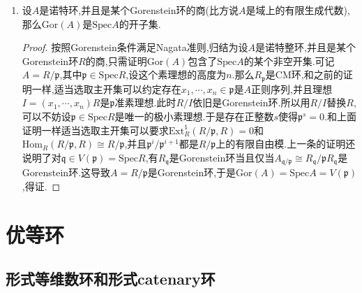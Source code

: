 \begin{enumerate}
\begin{proof}
    	于是$A_{\mathfrak{q}}$是Gorenstein环当且仅当$A_{\mathfrak{q}}/\mathfrak{p}A_{\mathfrak{q}}$是Gorenstein环,换句话讲$\mathrm{Gor}(A/\mathfrak{p})=\mathrm{Gor}(A)\cap V(\mathfrak{p})$.最后Nagata准则告诉我们$\mathrm{Gor}(A/\mathfrak{p})$包含了$V(\mathfrak{p})$的非空开子集,这验证了拓扑Nagata准则的第二个条件.
    \end{proof}
    \item 设$A$是诺特环,并且是某个Gorenstein环的商(比方说$A$是域上的有限生成代数),那么$\mathrm{Gor}(A)$是$\mathrm{Spec}A$的开子集.
    \begin{proof}
    	
    	按照Gorenstein条件满足Nagata准则,归结为设$A$是诺特整环,并且是某个Gorenstein环$R$的商,只需证明$\mathrm{Gor}(A)$包含了$\mathrm{Spec}A$的某个非空开集.可记$A=R/\mathfrak{p}$,其中$\mathfrak{p}\in\mathrm{Spec}R$,设这个素理想的高度为$n$.那么$R_{\mathfrak{p}}$是CM环,和之前的证明一样,适当选取主开集可以约定存在$x_1,\cdots,x_n\in\mathfrak{p}$是$A$正则序列,并且理想$I=(x_1,\cdots,x_n)R$是$\mathfrak{p}$准素理想.此时$R/I$依旧是Gorenstein环.所以用$R/I$替换$R$,可以不妨设$\mathfrak{p}\in\mathrm{Spec}R$是唯一的极小素理想.于是存在正整数$s$使得$\mathfrak{p}^s=0$.和上面证明一样适当选取主开集可以要求$\mathrm{Ext}_R^1(R/\mathfrak{p},R)=0$和$\mathrm{Hom}_R(R/\mathfrak{p},R)\cong R/\mathfrak{p}$,并且$\mathfrak{p}^i/\mathfrak{p}^{i+1}$都是$R/\mathfrak{p}$上的有限自由模.上一条的证明还说明了对$\mathfrak{q}\in V(\mathfrak{p})=\mathrm{Spec}R$,有$R_{\mathfrak{q}}$是Gorenstein环当且仅当$A_{\mathfrak{q}/\mathfrak{p}}\cong R_{\mathfrak{q}}/\mathfrak{p}R_{\mathfrak{q}}$是Gorenstein环.这导致$A=R/\mathfrak{p}$是Gorenstein环,于是$\mathrm{Gor}(A)=\mathrm{Spec}A=V(\mathfrak{p})$,得证.
    \end{proof}
\end{enumerate}
\newpage
\section{优等环}
\subsection{形式等维数环和形式catenary环}

